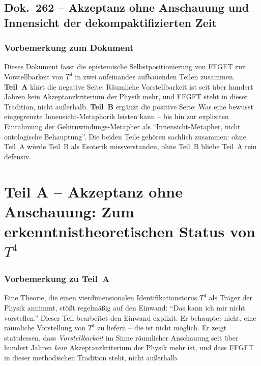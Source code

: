 
\chapter*{Dok.~262 -- Akzeptanz ohne Anschauung und Innensicht der dekompaktifizierten Zeit}

\section*{Vorbemerkung zum Dokument}

Dieses Dokument fasst die epistemische Selbstpositionierung von FFGFT
zur Vorstellbarkeit von $T^4$ in zwei aufeinander aufbauenden Teilen
zusammen. \textbf{Teil~A} klärt die negative Seite: Räumliche
Vorstellbarkeit ist seit über hundert Jahren kein Akzeptanzkriterium
der Physik mehr, und FFGFT steht in dieser Tradition, nicht außerhalb.
\textbf{Teil~B} ergänzt die positive Seite: Was eine bewusst
eingegrenzte Innensicht-Metaphorik leisten kann -- bis hin zur
expliziten Einrahmung der Gehirnwindungs-Metapher als
\enquote{Innensicht-Metapher, nicht ontologische Behauptung}. Die
beiden Teile gehören sachlich zusammen: ohne Teil~A würde Teil~B als
Esoterik missverstanden, ohne Teil~B bliebe Teil~A rein defensiv.

\part*{Teil A -- Akzeptanz ohne Anschauung: Zum erkenntnistheoretischen Status von $T^4$}

\section*{Vorbemerkung zu Teil~A}

Eine Theorie, die einen vierdimensionalen Identifikationstorus $T^4$ als
Träger der Physik annimmt, stößt regelmäßig auf den Einwand: \enquote{Das
kann ich mir nicht vorstellen.} Dieser Teil bearbeitet den Einwand
explizit. Er behauptet nicht, eine räumliche Vorstellung von $T^4$ zu
liefern -- die ist nicht möglich. Er zeigt stattdessen, dass
\emph{Vorstellbarkeit} im Sinne räumlicher Anschauung seit über hundert
Jahren \emph{kein} Akzeptanzkriterium der Physik mehr ist, und dass
FFGFT in dieser methodischen Tradition steht, nicht außerhalb.

